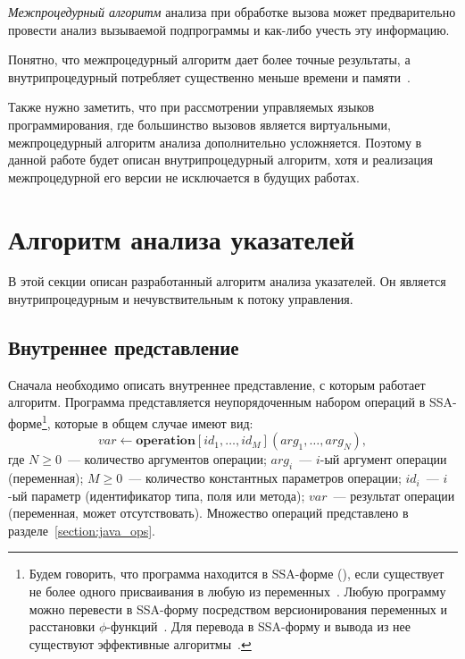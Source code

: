 \documentclass[14pt,titlepage,draft]{extarticle}
\let\mathphi\phi
\renewcommand{\phi}{\ensuremath{\mathphi}}
\newcommand{\op}[1]{\mathbf{#1}}
\begin{document}
    \emph{Межпроцедурный алгоритм} анализа при обработке вызова может
    предварительно провести анализ вызываемой подпрограммы и как-либо учесть
    эту информацию.

    Понятно, что межпроцедурный алгоритм дает более точные результаты,
    а внутрипроцедурный потребляет существенно меньше времени и
    памяти~\cite[с.~117]{andersen}.

    Также нужно заметить, что при рассмотрении управляемых языков
    программирования, где большинство вызовов является виртуальными,
    межпроцедурный алгоритм анализа дополнительно усложняется. Поэтому в
    данной работе будет описан внутрипроцедурный алгоритм, хотя и реализация
    межпроцедурной его версии не исключается в будущих работах.

  \section{Алгоритм анализа указателей}

    В этой секции описан разработанный алгоритм анализа указателей. Он является
    внутрипроцедурным и нечувствительным к потоку управления.

  \subsection{Внутреннее представление}

    Сначала необходимо описать внутреннее представление, с которым работает
    алгоритм. Программа представляется неупорядоченным набором операций в
    SSA-форме\footnote{
      Будем говорить, что программа находится в SSA-форме (), если существует не более одного присваивания в любую из
      переменных~\cite{ssa}.
      Любую программу можно перевести в SSA-форму посредством
      версионирования переменных и расстановки \phi-функций~\cite{ssa}.
      Для перевода в SSA-форму и вывода из нее существуют эффективные
      алгоритмы~\cite{bilardi_ssa, briggs_ssa}.
    }, которые в общем случае имеют вид:
    \[ var \gets \op{operation}[id_1, \ldots, id_M](arg_1, \ldots, arg_N), \]
    где
    $N \geq 0$~--- количество аргументов операции;
    $arg_i$~--- $i$-ый аргумент операции (переменная);
    $M \geq 0$~--- количество константных параметров операции;
    $id_i$~--- $i$-ый параметр (идентификатор типа, поля или метода);
    $var$~--- результат операции (переменная, может отсутствовать).
    Множество операций представлено в разделе~\ref{section:java_ops}.
\end{document}
